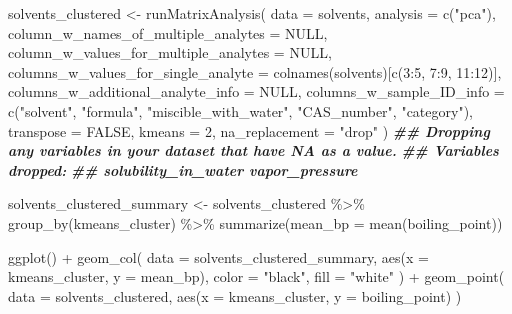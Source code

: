 \documentclass[
]{krantz}
\newenvironment{Shaded}{\begin{snugshade}}{\end{snugshade}}
\newcommand{\AttributeTok}[1]{\textcolor[rgb]{0.77,0.63,0.00}{#1}}
\newcommand{\ConstantTok}[1]{\textcolor[rgb]{0.00,0.00,0.00}{#1}}
\newcommand{\DecValTok}[1]{\textcolor[rgb]{0.00,0.00,0.81}{#1}}
\newcommand{\DocumentationTok}[1]{\textcolor[rgb]{0.56,0.35,0.01}{\textbf{\textit{#1}}}}
\newcommand{\FunctionTok}[1]{\textcolor[rgb]{0.00,0.00,0.00}{#1}}
\newcommand{\NormalTok}[1]{#1}
\newcommand{\OtherTok}[1]{\textcolor[rgb]{0.56,0.35,0.01}{#1}}
\newcommand{\SpecialCharTok}[1]{\textcolor[rgb]{0.00,0.00,0.00}{#1}}
\newcommand{\StringTok}[1]{\textcolor[rgb]{0.31,0.60,0.02}{#1}}
\begin{document}
\begin{Shaded}
\begin{Highlighting}[]
\NormalTok{solvents\_clustered }\OtherTok{\textless{}{-}} \FunctionTok{runMatrixAnalysis}\NormalTok{(}
  \AttributeTok{data =}\NormalTok{ solvents,}
  \AttributeTok{analysis =} \FunctionTok{c}\NormalTok{(}\StringTok{"pca"}\NormalTok{),}
  \AttributeTok{column\_w\_names\_of\_multiple\_analytes =} \ConstantTok{NULL}\NormalTok{,}
  \AttributeTok{column\_w\_values\_for\_multiple\_analytes =} \ConstantTok{NULL}\NormalTok{,}
  \AttributeTok{columns\_w\_values\_for\_single\_analyte =} \FunctionTok{colnames}\NormalTok{(solvents)[}\FunctionTok{c}\NormalTok{(}\DecValTok{3}\SpecialCharTok{:}\DecValTok{5}\NormalTok{, }\DecValTok{7}\SpecialCharTok{:}\DecValTok{9}\NormalTok{, }\DecValTok{11}\SpecialCharTok{:}\DecValTok{12}\NormalTok{)],}
  \AttributeTok{columns\_w\_additional\_analyte\_info =} \ConstantTok{NULL}\NormalTok{,}
  \AttributeTok{columns\_w\_sample\_ID\_info =} \FunctionTok{c}\NormalTok{(}\StringTok{"solvent"}\NormalTok{, }\StringTok{"formula"}\NormalTok{, }\StringTok{"miscible\_with\_water"}\NormalTok{, }\StringTok{"CAS\_number"}\NormalTok{, }\StringTok{"category"}\NormalTok{),}
  \AttributeTok{transpose =} \ConstantTok{FALSE}\NormalTok{,}
  \AttributeTok{kmeans =} \DecValTok{2}\NormalTok{,}
  \AttributeTok{na\_replacement =} \StringTok{"drop"}
\NormalTok{)}
\DocumentationTok{\#\# Dropping any variables in your dataset that have NA as a value.}
\DocumentationTok{\#\# Variables dropped:}
\DocumentationTok{\#\# solubility\_in\_water vapor\_pressure}

\NormalTok{solvents\_clustered\_summary }\OtherTok{\textless{}{-}}\NormalTok{ solvents\_clustered }\SpecialCharTok{\%\textgreater{}\%}
  \FunctionTok{group\_by}\NormalTok{(kmeans\_cluster) }\SpecialCharTok{\%\textgreater{}\%}
  \FunctionTok{summarize}\NormalTok{(}\AttributeTok{mean\_bp =} \FunctionTok{mean}\NormalTok{(boiling\_point))}

\FunctionTok{ggplot}\NormalTok{() }\SpecialCharTok{+} 
  \FunctionTok{geom\_col}\NormalTok{(}
    \AttributeTok{data =}\NormalTok{ solvents\_clustered\_summary,}
    \FunctionTok{aes}\NormalTok{(}\AttributeTok{x =}\NormalTok{ kmeans\_cluster, }\AttributeTok{y =}\NormalTok{ mean\_bp),}
    \AttributeTok{color =} \StringTok{"black"}\NormalTok{, }\AttributeTok{fill =} \StringTok{"white"}
\NormalTok{  ) }\SpecialCharTok{+}
  \FunctionTok{geom\_point}\NormalTok{(}
    \AttributeTok{data =}\NormalTok{ solvents\_clustered,}
    \FunctionTok{aes}\NormalTok{(}\AttributeTok{x =}\NormalTok{ kmeans\_cluster, }\AttributeTok{y =}\NormalTok{ boiling\_point)}
\NormalTok{  )}
\end{Highlighting}
\end{Shaded}
\end{document}
